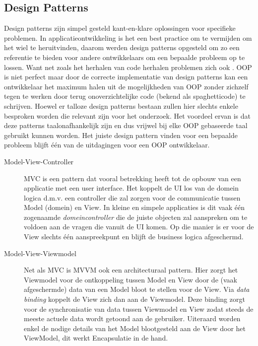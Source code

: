 \subsection{Design Patterns}
Design patterns zijn simpel gesteld kant-en-klare oplossingen voor specifieke problemen. In applicatieontwikkeling is het een best practice om te vermijden om het wiel te heruitvinden, daarom werden design patterns opgesteld om zo een referentie te bieden voor andere ontwikkelaars om een bepaalde probleem op te lossen. Want net zoals het herhalen van code herhalen problemen zich ook . OOP is niet perfect maar door de correcte implementatie van design patterns kan een ontwikkelaar het maximum halen uit de mogelijkheden van OOP zonder zichzelf tegen te werken door terug onoverzichtelijke code (bekend als spaghetticode) te schrijven. Hoewel er talloze design patterns bestaan zullen hier slechts enkele besproken worden die relevant zijn voor het onderzoek. Het voordeel ervan is dat deze patterns taalonafhankelijk zijn en dus vrijwel bij elke OOP gebaseerde taal gebruikt kunnen worden. Het juiste design pattern vinden voor een bepaalde probleem blijft één van de uitdagingen voor een OOP ontwikkelaar.

\begin{description}
  \item [Model-View-Controller] MVC is een pattern dat vooral betrekking heeft tot de opbouw van een applicatie met een user interface. Het koppelt de UI los van de domein logica d.m.v. een controller die zal zorgen voor de communicatie tussen Model (domein) en View. In kleine en simpele applicaties is dit vaak één zogenaamde \textit{domeincontroller} die de juiste objecten zal aanspreken om te voldoen aan de vragen die vanuit de UI komen. Op die manier is er voor de View slechts één aanspreekpunt en blijft de business logica afgeschermd.
  \item [Model-View-Viewmodel] Net als MVC is MVVM ook een architecturaal pattern. Hier zorgt het Viewmodel voor de ontkoppeling tussen Model en View door de (vaak afgeschermde) data van een Model bloot te stellen voor de View. Via \textit{data binding} koppelt de View zich dan aan de Viewmodel. Deze binding zorgt voor de synchronisatie van data tussen Viewmodel en View zodat steeds de meeste actuele data wordt getoond aan de gebruiker. Uiteraard worden enkel de nodige details van het Model blootgesteld aan de View door het ViewModel, dit werkt Encapsulatie in de hand.
\end{description}

